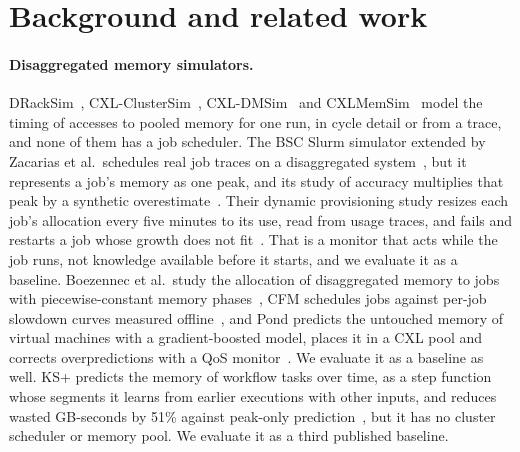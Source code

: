 \documentclass[11pt]{article}
\begin{document}
\section{Background and related work}
\label{sec:related}

\paragraph{Disaggregated memory simulators.} DRackSim~\cite{Puri2024DRackSim},
CXL-ClusterSim~\cite{CXLClusterSim}, CXL-DMSim~\cite{CXLDMSim} and CXLMemSim~\cite{Yang2023CXLMemSim} model
the timing of accesses to pooled memory for one run, in cycle detail or from a trace, and none of them has a
job scheduler. The BSC Slurm simulator extended by Zacarias et al.\ schedules real job traces on a
disaggregated system~\cite{Zacarias2021Throughput}, but it represents a job's memory as one peak, and its study
of accuracy multiplies that peak by a synthetic overestimate~\cite{Zacarias2021Accurate}. Their dynamic
provisioning study resizes each job's allocation every five minutes to its use, read from usage traces, and
fails and restarts a job whose growth does not fit~\cite{Zacarias2023Dynamic}. That is a monitor that acts
while the job runs, not knowledge available before it starts, and we evaluate it as a baseline. Boezennec et al.\ study the
allocation of disaggregated memory to jobs with piecewise-constant memory phases~\cite{Boezennec2024}, CFM
schedules jobs against per-job slowdown curves measured offline~\cite{Amaro2020CFM}, and Pond predicts the
untouched memory of virtual machines with a gradient-boosted model, places it in a CXL pool and corrects
overpredictions with a QoS monitor~\cite{Li2023Pond}. We evaluate it as a baseline as well. KS+ predicts the memory of
workflow tasks over time, as a step function whose segments it learns from earlier executions with other inputs,
and reduces wasted GB-seconds by 51\% against peak-only prediction~\cite{KSplus2024}, but it has no cluster
scheduler or memory pool. We evaluate it as a third published baseline.
\end{document}
